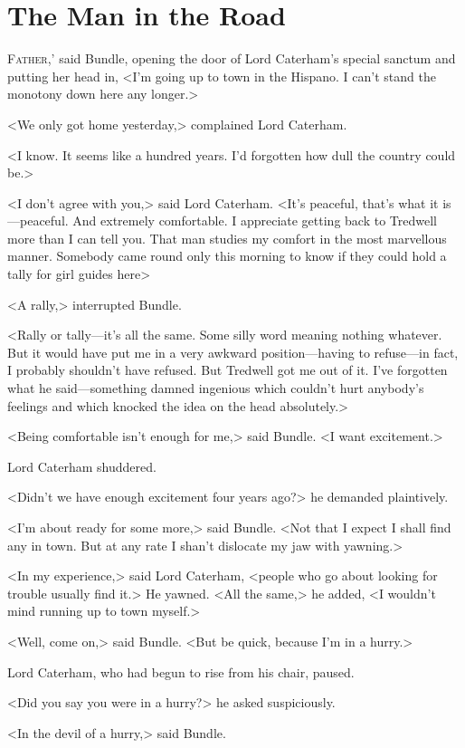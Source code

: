 \chapter{The Man in the Road}

\lettrine[ante=`]{F}{ather,}' said Bundle, opening the door of Lord Caterham's special sanctum and putting her head in, <I'm going up to town in the Hispano. I can't stand the monotony down here any longer.>

\zz
<We only got home yesterday,> complained Lord Caterham.

<I know. It seems like a hundred years. I'd forgotten how dull the country could be.>

<I don't agree with you,> said Lord Caterham. <It's peaceful, that's what it is—peaceful. And extremely comfortable. I appreciate getting back to Tredwell more than I can tell you. That man studies my comfort in the most marvellous manner. Somebody came round only this morning to know if they could hold a tally for girl guides here\longdash>

<A rally,> interrupted Bundle.

<Rally or tally—it's all the same. Some silly word meaning nothing whatever. But it would have put me in a very awkward position—having to refuse—in fact, I probably shouldn't have refused. But Tredwell got me out of it. I've forgotten what he said—something damned ingenious which couldn't hurt anybody's feelings and which knocked the idea on the head absolutely.>

<Being comfortable isn't enough for me,> said Bundle. <I want excitement.>

Lord Caterham shuddered.

<Didn't we have enough excitement four years ago?> he demanded plaintively.

<I'm about ready for some more,> said Bundle. <Not that I expect I shall find any in town. But at any rate I shan't dislocate my jaw with yawning.>

<In my experience,> said Lord Caterham, <people who go about looking for trouble usually find it.> He yawned. <All the same,> he added, <I wouldn't mind running up to town myself.>

<Well, come on,> said Bundle. <But be quick, because I'm in a hurry.>

Lord Caterham, who had begun to rise from his chair, paused.

<Did you say you were in a hurry?> he asked suspiciously.

<In the devil of a hurry,> said Bundle.

